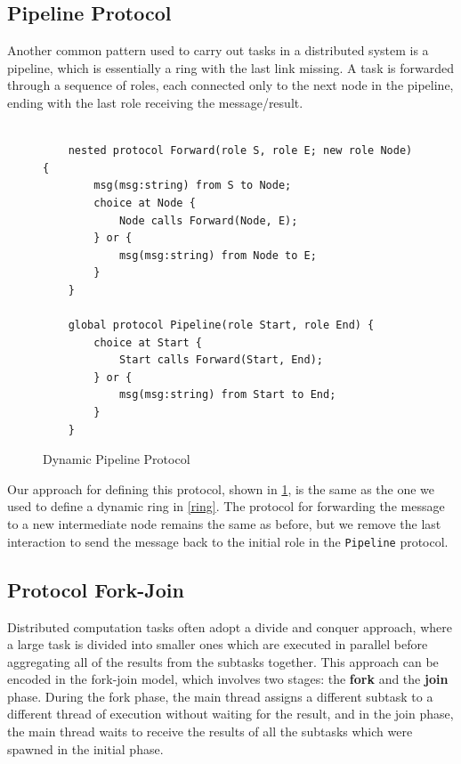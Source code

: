 \documentclass[12pt,twoside]{report}
\begin{document}
\subsection{Pipeline Protocol}

Another common pattern used to carry out tasks in a distributed system is a pipeline, which is essentially a ring with the last link missing. A task is forwarded through a sequence of roles, each connected only to the next node in the pipeline, ending with the last role receiving the message/result.

\begin{figure}[htb!]
    \centering
    \lstset{language=Scribble}
    \begin{lstlisting}
    
    nested protocol Forward(role S, role E; new role Node) {
        msg(msg:string) from S to Node;
        choice at Node {
            Node calls Forward(Node, E);
        } or {
            msg(msg:string) from Node to E;
        }
    }
        
    global protocol Pipeline(role Start, role End) {
        choice at Start {
            Start calls Forward(Start, End);
        } or {
            msg(msg:string) from Start to End;
        }
    }
    \end{lstlisting}
    \caption{Dynamic Pipeline Protocol}
    \label{pipeline-protocol}
\end{figure}{}


Our approach for defining this protocol, shown in \ref{pipeline-protocol}, is the same as the one we used to define a dynamic ring in \ref{ring}. The protocol for forwarding the message to a new intermediate node remains the same as before, but we remove the last interaction to send the message back to the initial role in the \texttt{Pipeline} protocol.

\subsection{Protocol Fork-Join}
Distributed computation tasks often adopt a divide and conquer approach, where a large task is divided into smaller ones which are executed in parallel before aggregating all of the results from the subtasks together. This approach can be encoded in the fork-join model, which involves two stages: the \textbf{fork} and the \textbf{join} phase. During the fork phase, the main thread assigns a different subtask to a different thread of execution without waiting for the result, and in the join phase, the main thread waits to receive the results of all the subtasks which were spawned in the initial phase.\\
\end{document}
